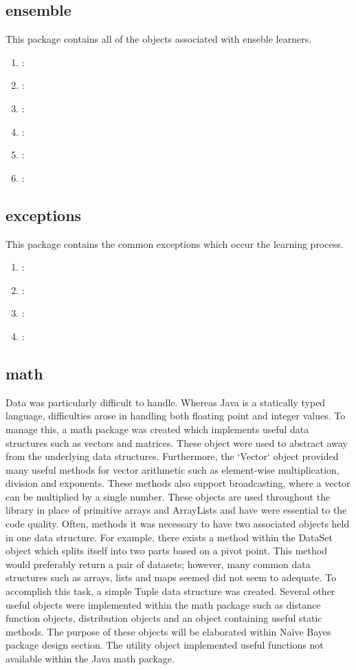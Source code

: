 \documentclass[11pt]{article}
\begin{document}
\subsection{ensemble}
This package contains all of the objects associated with enseble learners.

\begin{enumerate}
  \item {}:
  \item {}:
  \item {}:
  \item {}:
  \item {}:
  \item {}:
\end{enumerate}

\subsection{exceptions}
This package contains the common exceptions which occur the learning process.

\begin{enumerate}
  \item {}:
  \item {}:
  \item {}:
  \item {}:
\end{enumerate}

\subsection{math}
Data was particularly difficult to handle. Whereas Java is a statically typed language, difficulties arose in handling both floating point and integer values. To manage this, a math package was created which implements useful data structures such as vectors and matrices. These object were used to abstract away from the underlying data structures. Furthermore, the `Vector` object provided many useful methods for vector arithmetic such as element-wise multiplication, division and exponents. These methods also support broadcasting, where a vector can be multiplied by a single number. These objects are used throughout the library in place of primitive arrays and ArrayLists and have were essential to the code quality. Often, methods it was necessary to have two associated objects held in one data structure. For example, there exists a method within the DataSet object which splits itself into two parts based on a pivot point. This method would preferably return a pair of datasets; however, many common data structures such as arrays, lists and maps seemed did not seem to adequate. To accomplish this task, a simple Tuple data structure was created. Several other useful objects were implemented within the math package such as distance function objects, distribution objects and an object containing useful static methods. The purpose of these objects will be elaborated within Naïve Bayes package design section. The utility object implemented useful functions not available within the Java math package.
\end{document}
